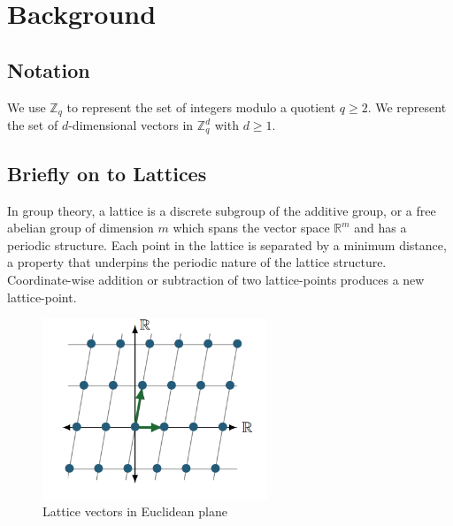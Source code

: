 \documentclass[11pt,
  titlepage=false,
  abstract=on,
]{scrreprt}
\begin{document}

\section{Background}
\label{sec:background}

\subsection{Notation}
We use $\mathbb{Z}_q$ to represent the set of integers modulo a quotient $q \geq 2$. We represent the set of $d$-dimensional vectors in $\mathbb{Z}^d_q$
with $d \geq 1$.
\subsection{Briefly on to Lattices}
In group theory, a lattice is a discrete subgroup of the additive group, or a free abelian group of dimension $m$ which spans the vector space $\mathbb{R}^m$ and has a periodic structure. 
Each point in the lattice is separated by a minimum distance, a property that underpins the periodic nature of the lattice structure. Coordinate-wise addition or subtraction of two lattice-points 
produces a new lattice-point.





\begin{figure}[h]
  \centering
  \includegraphics[width=0.6\textwidth]{figures/lattice-with-lattice-vectors.png}
  \caption{Lattice vectors in Euclidean plane \cite{latticesInPQC}}
  \label{fig:LatticeWithLatticeVectors}
\end{figure}
\end{document}
